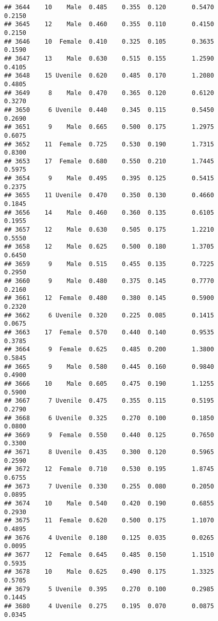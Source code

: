 \documentclass[
]{article}
\begin{document}
\begin{verbatim}
## 3644    10    Male  0.485    0.355  0.120       0.5470         0.2150
## 3645    12    Male  0.460    0.355  0.110       0.4150         0.2150
## 3646    10  Female  0.410    0.325  0.105       0.3635         0.1590
## 3647    13    Male  0.630    0.515  0.155       1.2590         0.4105
## 3648    15 Uvenile  0.620    0.485  0.170       1.2080         0.4805
## 3649     8    Male  0.470    0.365  0.120       0.6120         0.3270
## 3650     6 Uvenile  0.440    0.345  0.115       0.5450         0.2690
## 3651     9    Male  0.665    0.500  0.175       1.2975         0.6075
## 3652    11  Female  0.725    0.530  0.190       1.7315         0.8300
## 3653    17  Female  0.680    0.550  0.210       1.7445         0.5975
## 3654     9    Male  0.495    0.395  0.125       0.5415         0.2375
## 3655    11 Uvenile  0.470    0.350  0.130       0.4660         0.1845
## 3656    14    Male  0.460    0.360  0.135       0.6105         0.1955
## 3657    12    Male  0.630    0.505  0.175       1.2210         0.5550
## 3658    12    Male  0.625    0.500  0.180       1.3705         0.6450
## 3659     9    Male  0.515    0.455  0.135       0.7225         0.2950
## 3660     9    Male  0.480    0.375  0.145       0.7770         0.2160
## 3661    12  Female  0.480    0.380  0.145       0.5900         0.2320
## 3662     6 Uvenile  0.320    0.225  0.085       0.1415         0.0675
## 3663    17  Female  0.570    0.440  0.140       0.9535         0.3785
## 3664     9  Female  0.625    0.485  0.200       1.3800         0.5845
## 3665     9    Male  0.580    0.445  0.160       0.9840         0.4900
## 3666    10    Male  0.605    0.475  0.190       1.1255         0.5900
## 3667     7 Uvenile  0.475    0.355  0.115       0.5195         0.2790
## 3668     6 Uvenile  0.325    0.270  0.100       0.1850         0.0800
## 3669     9  Female  0.550    0.440  0.125       0.7650         0.3300
## 3671     8 Uvenile  0.435    0.300  0.120       0.5965         0.2590
## 3672    12  Female  0.710    0.530  0.195       1.8745         0.6755
## 3673     7 Uvenile  0.330    0.255  0.080       0.2050         0.0895
## 3674    10    Male  0.540    0.420  0.190       0.6855         0.2930
## 3675    11  Female  0.620    0.500  0.175       1.1070         0.4895
## 3676     4 Uvenile  0.180    0.125  0.035       0.0265         0.0095
## 3677    12  Female  0.645    0.485  0.150       1.1510         0.5935
## 3678    10    Male  0.625    0.490  0.175       1.3325         0.5705
## 3679     5 Uvenile  0.395    0.270  0.100       0.2985         0.1445
## 3680     4 Uvenile  0.275    0.195  0.070       0.0875         0.0345

\end{verbatim}
\end{document}
